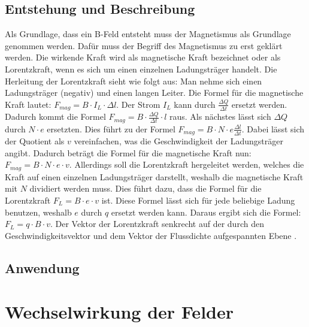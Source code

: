 \subsection{Entstehung und Beschreibung}
Als Grundlage, dass ein B-Feld entsteht muss der Magnetismus als Grundlage genommen werden.
Dafür muss der Begriff des Magnetismus zu erst geklärt werden.
Die wirkende Kraft wird als magnetische Kraft bezeichnet oder als Lorentzkraft, wenn es sich um einen einzelnen Ladungsträger handelt.
Die Herleitung der Lorentzkraft sieht wie folgt aus:
Man nehme sich einen Ladungsträger (negativ) und einen langen Leiter.
Die Formel für die magnetische Kraft lautet: $F_{mag} =  B \cdot I_L \cdot \Delta l$.
Der Strom $I_L$ kann durch $\frac{\Delta Q}{\Delta t}$ ersetzt werden.
Dadurch kommt die Formel $F_{mag} = B \cdot \frac{\Delta Q}{\Delta t} \cdot l$ raus. 
Als nächstes lässt sich $\Delta Q$ durch $N \cdot e$ ersetzten.
Dies führt zu der Formel $F_{mag} = B \cdot N \cdot e \frac{\Delta l}{\Delta t}$.
Dabei lässt sich der Quotient als $v$ vereinfachen, was die Geschwindigkeit der Ladungsträger angibt.
Dadurch beträgt die Formel für die magnetische Kraft nun: $F_{mag} = B \cdot N \cdot e \cdot v$.
Allerdings soll die Lorentzkraft hergeleitet werden, welches die Kraft auf einen einzelnen Ladungsträger darstellt, weshalb die magnetische Kraft mit $N$ dividiert werden muss.
Dies führt dazu, dass die Formel für die Lorentzkraft $F_L = B \cdot e \cdot v$ ist.
Diese Formel lässt sich für jede beliebige Ladung benutzen, weshalb $e$ durch $q$ ersetzt werden kann.
Daraus ergibt sich die Formel: $F_L = q \cdot B \cdot v$.
Der Vektor der Lorentzkraft senkrecht auf der durch den Geschwindigkeitsvektor und dem Vektor der Flussdichte aufgespannten Ebene \cite{Lorentzkraft}.%
\subsection{Anwendung}
\section{Wechselwirkung der Felder}%